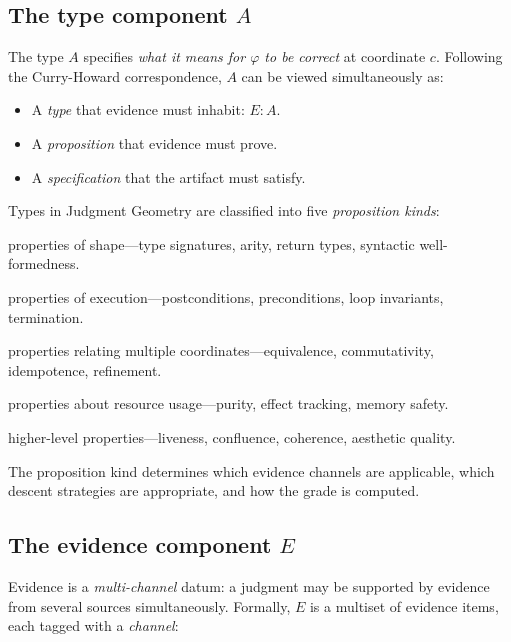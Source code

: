 \subsection{The type component \texorpdfstring{$A$}{A}}
\label{sec:judgment:type-component}

The type $A$ specifies \emph{what it means for $\varphi$ to be
correct} at coordinate $c$.  Following the Curry-Howard correspondence,
$A$ can be viewed simultaneously as:
\begin{itemize}
\item A \emph{type} that evidence must inhabit: $E : A$.
\item A \emph{proposition} that evidence must prove.
\item A \emph{specification} that the artifact must satisfy.
\end{itemize}

Types in Judgment Geometry are classified into five \emph{proposition
kinds}:

\begin{description}[leftmargin=2.5em]
\item[Structural:] properties of shape---type signatures, arity,
  return types, syntactic well-formedness.
\item[Behavioral:] properties of execution---postconditions,
  preconditions, loop invariants, termination.
\item[Relational:] properties relating multiple coordinates---equivalence,
  commutativity, idempotence, refinement.
\item[Resource:] properties about resource usage---purity, effect
  tracking, memory safety.
\item[Semantic:] higher-level properties---liveness, confluence,
  coherence, aesthetic quality.
\end{description}

The proposition kind determines which evidence channels are applicable,
which descent strategies are appropriate, and how the grade is computed.

\subsection{The evidence component \texorpdfstring{$E$}{E}}
\label{sec:judgment:evidence}

Evidence is a \emph{multi-channel} datum: a judgment may be supported
by evidence from several sources simultaneously.  Formally, $E$ is a
multiset of evidence items, each tagged with a \emph{channel}:

